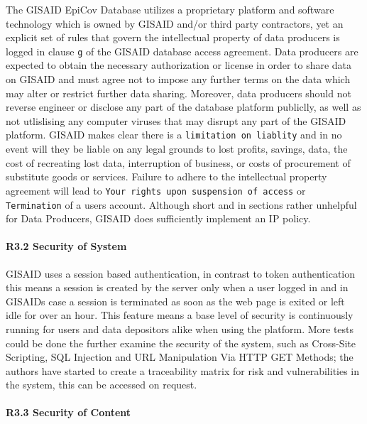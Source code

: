 \documentclass{article}
\begin{document}
The GISAID EpiCov Database utilizes a proprietary platform and software
technology which is owned by GISAID and/or third party contractors, yet
an explicit set of rules that govern the intellectual property of data
producers is logged in clause \texttt{g} of the GISAID database access
agreement. Data producers are expected to obtain the necessary
authorization or license in order to share data on GISAID and must agree
not to impose any further terms on the data which may alter or restrict
further data sharing. Moreover, data producers should not reverse
engineer or disclose any part of the database platform publiclly, as
well as not utlislising any computer viruses that may disrupt any part
of the GISAID platform. GISAID makes clear there is a
\texttt{limitation\ on\ liablity} and in no event will they be liable on
any legal grounds to lost profits, savings, data, the cost of recreating
lost data, interruption of business, or costs of procurement of
substitute goods or services. Failure to adhere to the intellectual
property agreement will lead to
\texttt{Your\ rights\ upon\ suspension\ of\ access} or
\texttt{Termination} of a users account. Although short and in sections
rather unhelpful for Data Producers, GISAID does sufficiently implement
an IP policy.

\hypertarget{r3.2-security-of-system}{%
\paragraph{R3.2 Security of System}\label{r3.2-security-of-system}}

GISAID uses a session based authentication, in contrast to token
authentication this means a session is created by the server only when a
user logged in and in GISAIDs case a session is terminated as soon as
the web page is exited or left idle for over an hour. This feature means
a base level of security is continuously running for users and data
depositors alike when using the platform. More tests could be done the
further examine the security of the system, such as Cross-Site
Scripting, SQL Injection and URL Manipulation Via HTTP GET Methods; the
authors have started to create a traceability matrix for risk and
vulnerabilities in the system, this can be accessed on request.

\hypertarget{r3.3-security-of-content}{%
\paragraph{R3.3 Security of Content}\label{r3.3-security-of-content}}
\end{document}
